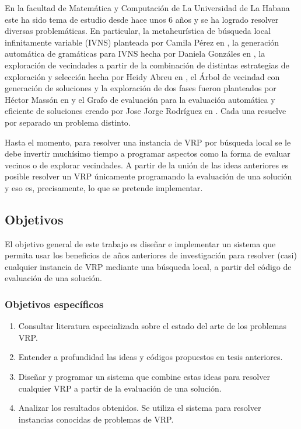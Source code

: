 En la facultad de Matemática y Computación de La Universidad de La Habana este ha sido tema de estudio desde hace unos 6 años y se ha logrado resolver diversas problemáticas. En particular, la metaheurística de búsqueda local infinitamente variable (IVNS) planteada por Camila Pérez en \cite{Camila}, la generación automática de gramáticas para IVNS hecha por Daniela Gonzáles en \cite{Daniela}, la exploración de vecindades a partir de la combinación de distintas estrategias de exploración y selección hecha por Heidy Abreu en \cite{Heidy}, el Árbol de vecindad con generación de soluciones y la exploración de dos fases fueron planteados por Héctor Massón en \cite{Hector} y el Grafo de evaluación para la evaluación automática y eficiente de soluciones creado por Jose Jorge Rodríguez en \cite{JJ}. Cada una resuelve por separado un problema distinto. 

Hasta el momento, para resolver una instancia de VRP por búsqueda local se le debe invertir muchísimo tiempo a programar aspectos como la forma de evaluar vecinos o de explorar vecindades. A partir de la unión de las ideas anteriores es posible resolver un VRP únicamente programando la evaluación de una solución y eso es, precisamente, lo que se pretende implementar. 


\subsection*{Objetivos}
El objetivo general de este trabajo es diseñar e implementar un sistema que permita usar los beneficios de años anteriores de investigación para resolver (casi) cualquier instancia de VRP mediante una búsqueda local, a partir del código de evaluación de una solución.

\subsubsection*{Objetivos específicos}

\begin{enumerate}
	\item Consultar literatura especializada sobre el estado del arte de los problemas VRP.
	\item Entender a profundidad las ideas y códigos propuestos en tesis anteriores.
	\item Diseñar y programar un sistema que combine estas ideas para resolver cualquier VRP a partir de la evaluación de una solución.	
	\item Analizar los resultados obtenidos. Se utiliza el sistema para resolver instancias conocidas de problemas de VRP.
\end{enumerate}

